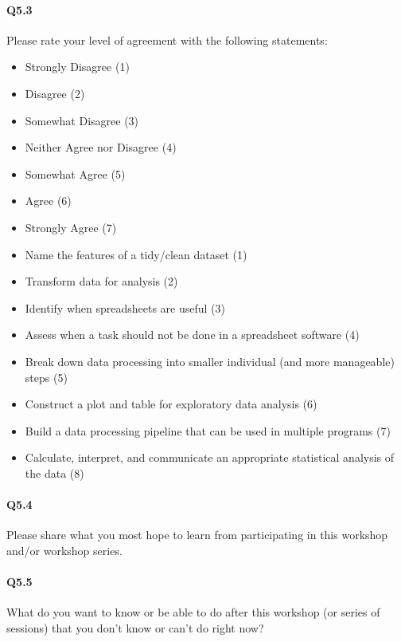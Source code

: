\documentclass[030-workshop.tex]{subfiles}
\begin{document}
    \paragraph{Q5.3}

        Please rate your level of agreement with the following statements:

        \begin{itemize}
            \item Strongly Disagree (1)
            \item Disagree (2)
            \item Somewhat Disagree (3)
            \item Neither Agree nor Disagree (4)
            \item Somewhat Agree (5)
            \item Agree (6)
            \item Strongly Agree (7)
        \end{itemize}

        \begin{itemize}
            \item Name the features of a tidy/clean dataset (1)
            \item Transform data for analysis (2)
            \item Identify when spreadsheets are useful (3)
            \item Assess when a task should not be done in a spreadsheet software (4)
            \item Break down data processing into smaller individual (and more manageable) steps (5)
            \item Construct a plot and table for exploratory data analysis (6)
            \item Build a data processing pipeline that can be used in multiple programs (7)
            \item Calculate, interpret, and communicate an appropriate statistical analysis of the data (8)
        \end{itemize}

    \paragraph{Q5.4}

        Please share what you most hope to learn from participating in this workshop and/or workshop series.

    \paragraph{Q5.5}

        What do you want to know or be able to do after this workshop (or series of sessions) that you don't know or can't do right now?
\end{document}
